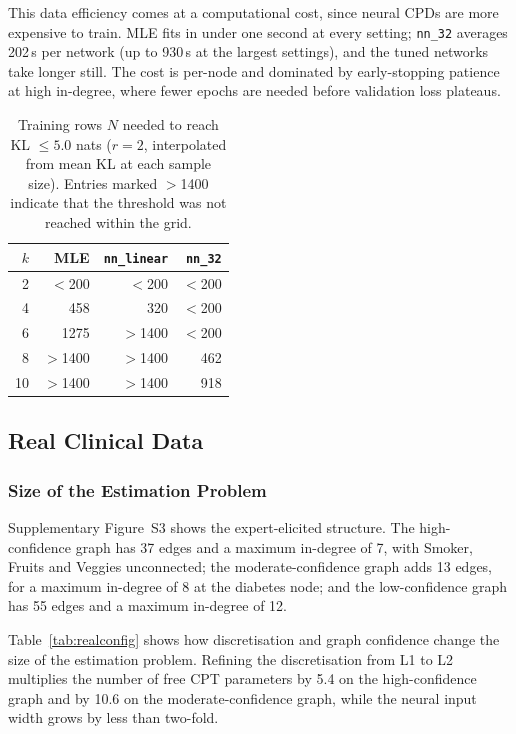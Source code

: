 \documentclass[a4paper,fleqn]{cas-dc}
\begin{document}
This data efficiency comes at a computational cost, since neural CPDs are more expensive to train. MLE fits in under one second at every setting; \texttt{nn\_32} averages 202\,s per network (up to 930\,s at the largest settings), and the tuned networks take longer still. The cost is per-node and dominated by early-stopping patience at high in-degree, where fewer epochs are needed before validation loss plateaus.

\begin{table}[tbp]
\caption{Training rows $N$ needed to reach KL $\leq 5.0$ nats ($r=2$, interpolated from mean KL at each sample size). Entries marked $>$1400 indicate that the threshold was not reached within the grid.}\label{tab:isokl}
\begin{tabular*}{\tblwidth}{@{\extracolsep{\fill}}rrrr@{}}
\toprule
$k$ & MLE & \texttt{nn\_linear} & \texttt{nn\_32} \\
\midrule
2 & $<$200 & $<$200 & $<$200 \\
4 & 458 & 320 & $<$200 \\
6 & 1275 & $>$1400 & $<$200 \\
8 & $>$1400 & $>$1400 & 462 \\
10 & $>$1400 & $>$1400 & 918 \\
\bottomrule
\end{tabular*}
\end{table}

\FloatBarrier
\subsection{Real Clinical Data}

\subsubsection{Size of the Estimation Problem}

Supplementary Figure~S3 shows the expert-elicited structure. The high-confidence graph has 37 edges and a maximum in-degree of 7, with Smoker, Fruits and Veggies unconnected; the moderate-confidence graph adds 13 edges, for a maximum in-degree of 8 at the diabetes node; and the low-confidence graph has 55 edges and a maximum in-degree of 12.

Table~\ref{tab:realconfig} shows how discretisation and graph confidence change the size of the estimation problem. Refining the discretisation from L1 to L2 multiplies the number of free CPT parameters by 5.4 on the high-confidence graph and by 10.6 on the moderate-confidence graph, while the neural input width grows by less than two-fold.
\end{document}

